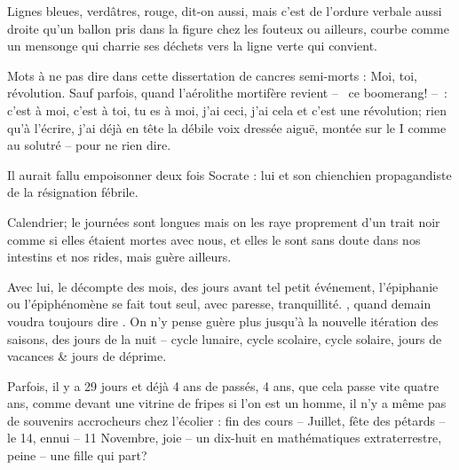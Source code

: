  Lignes  bleues, verdâtres,  rouge,  dit-on aussi, mais c’est de l’ordure verbale aussi droite qu’un
  ballon pris  dans la  figure chez  les fouteux ou  ailleurs, courbe  comme un
  mensonge qui charrie ses déchets vers la ligne verte qui convient.

  Mots à ne pas dire dans cette dissertation de cancres semi-morts : Moi, toi,
  révolution.  Sauf parfois,  quand  l’aérolithe mortifère  revient --~ ce
  boomerang! --~:~ c’est à moi, c’est  à toi, tu es à  moi, j’ai ceci,
  j’ai  cela et  c’est une  révolution; rien  qu’à l’écrire,  j’ai
  déjà en tête la  débile voix dressée aigu\"e, montée sur  le I comme au
  solutré -- pour ne rien dire.

  Il  aurait fallu  empoisonner  deux  fois Socrate  :  lui  et son  chienchien
  propagandiste de la résignation fébrile.

  Calendrier;  le journées  sont longues  mais on  les raye  proprement d’un
  trait noir comme  si elles étaient mortes  avec nous, et elles  le sont sans
  doute dans nos intestins et nos rides, mais guère ailleurs.

  Avec  lui, le  décompte des  mois, des  jours avant  tel petit  événement,
  l’épiphanie  ou  l’épiphénomène  se  fait tout  seul,  avec  paresse,
  tranquillité.  ,  quand  demain
  voudra toujours dire . On n’y pense guère
  plus jusqu’à la  nouvelle itération des saisons, des jours  de la nuit --
  cycle lunaire, cycle  scolaire, cycle solaire, jours de vacances  \& jours de
  déprime.

  Parfois, il y  a 29 jours et déjà  4 ans de passés, 4 ans,  que cela passe
  vite quatre ans, comme  devant une vitrine de fripes si  l’on est un homme,
  il n’y  a même pas  de souvenirs accrocheurs  chez l’écolier :  fin des
  cours -- Juillet, fête des pétards --  le 14, ennui -- 11 Novembre, joie --
  un dix-huit en mathématiques extraterrestre, peine -- une fille qui part?
